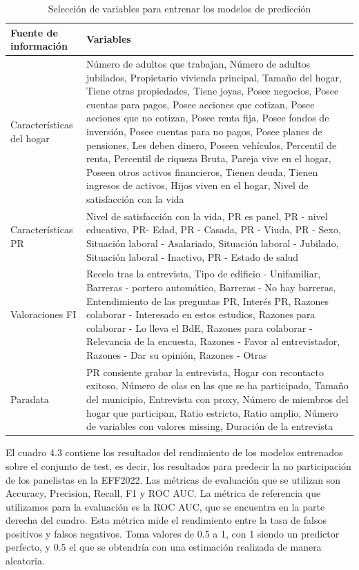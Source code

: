 \begin{table}
    \centering
    \begin{tabular}{|l|p{10cm}|}
    \hline
        \textbf{Fuente de información} & \textbf{Variables} \\ \hline
        Características del hogar & Número de adultos que trabajan, Número de adultos jubilados, Propietario vivienda principal, Tamaño del hogar, Tiene otras propiedades, Tiene joyas, Posee negocios, Posee cuentas para pagos, Posee acciones que cotizan, Posee acciones que no cotizan, Posee renta fija, Posee fondos de inversión, Posee cuentas para no pagos, Posee planes de pensiones, Les deben dinero, Poseen vehículos, Percentil de renta, Percentil de riqueza Bruta, Pareja vive en el hogar, Poseen otros activos financieros, Tienen deuda, Tienen ingresos de activos, Hijos viven en el hogar, Nivel de satisfacción con la vida \\ \hline
        Características PR & Nivel de satisfacción con la vida, PR es panel, PR - nivel educativo, PR- Edad, PR - Casada, PR - Viuda, PR - Sexo, Situación laboral - Asalariado, Situación laboral - Jubilado, Situación laboral - Inactivo, PR - Estado de salud \\ \hline
        Valoraciones FI & Recelo tras la entrevista, Tipo de edificio - Unifamiliar, Barreras - portero automático, Barreras - No hay barreras, Entendimiento de las preguntas PR, Interés PR, Razones colaborar - Interesado en estos estudios, Razones para colaborar - Lo lleva el BdE, Razones para colaborar - Relevancia de la encuesta, Razones - Favor al entrevistador, Razones - Dar su opinión, Razones - Otras \\ \hline
        Paradata & PR consiente grabar la entrevista, Hogar con recontacto exitoso, Número de olas en las que se ha participado, Tamaño del municipio, Entrevista con proxy, Número de miembros del hogar que participan, Ratio estricto, Ratio amplio, Número de variables con valores missing, Duración de la entrevista \\ \hline
    \end{tabular}
    \caption{Selección de variables para entrenar los modelos de predicción}
\end{table}

El cuadro 4.3 contiene los resultados del rendimiento de los modelos entrenados sobre el conjunto de test, es decir, los resultados para predecir la no participación de los panelistas en la EFF2022. Las métricas de evaluación que se utilizan son Accuracy, Precision, Recall, F1 y ROC AUC. La métrica de referencia que utilizamos para la evaluación es la ROC AUC, que se encuentra en la parte derecha del cuadro. Esta métrica mide el rendimiento entre la tasa de falsos positivos y falsos negativos. Toma valores de 0.5 a 1, con 1 siendo un predictor perfecto, y 0.5 el que se obtendría con una estimación realizada de manera aleatoria.

